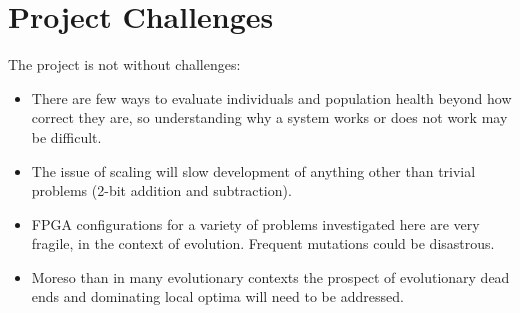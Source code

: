 \section{Project Challenges}
The project is not without challenges:
\begin{itemize}
	\item There are few ways to evaluate individuals and population health beyond how
		correct they are, so understanding why a system works or does not work may
		be difficult.
	\item The issue of scaling will slow development of anything other than
		trivial problems (2-bit addition and subtraction).
	\item FPGA configurations for a variety of problems investigated here are very fragile, in the
		context of evolution. Frequent mutations could be disastrous.
	\item Moreso than in many evolutionary contexts the prospect of evolutionary dead ends
		and dominating local optima will need to be addressed.
\end{itemize}

